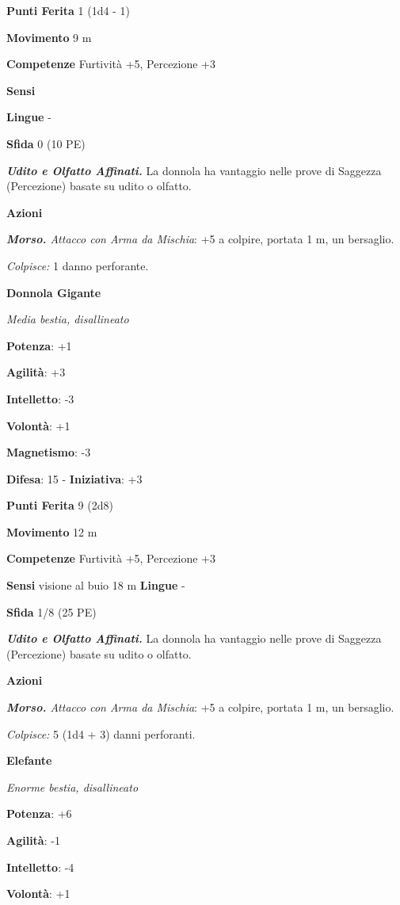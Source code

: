 \begin{multicols}{2}
\textbf{Punti Ferita} 1 (1d4 - 1)

\textbf{Movimento} 9 m

\textbf{Competenze} Furtività +5, Percezione +3

\textbf{Sensi} 

\textbf{Lingue} -

\textbf{Sfida} 0 (10 PE)\smallskip

\emph{\textbf{Udito e Olfatto Affinati.}} La donnola ha vantaggio nelle
prove di Saggezza (Percezione) basate su udito o olfatto.

\smallskip\textbf{Azioni}

\emph{\textbf{Morso.} Attacco con Arma da Mischia}: +5 a colpire,
portata 1 m, un bersaglio.

\emph{Colpisce:} 1 danno perforante.

\textbf{Donnola Gigante}

\emph{Media bestia, disallineato}

\textbf{Potenza}: +1

\textbf{Agilità}: +3

\textbf{Intelletto}: -3

\textbf{Volontà}: +1

\textbf{Magnetismo}: -3

\textbf{Difesa}: 15 - \textbf{Iniziativa}: +3

\textbf{Punti Ferita} 9 (2d8)

\textbf{Movimento} 12 m

\textbf{Competenze} Furtività +5, Percezione +3

\textbf{Sensi} visione al buio 18 m
\textbf{Lingue} -

\textbf{Sfida} 1/8 (25 PE)\smallskip

\emph{\textbf{Udito e Olfatto Affinati.}} La donnola ha vantaggio nelle
prove di Saggezza (Percezione) basate su udito o olfatto.

\smallskip\textbf{Azioni}

\emph{\textbf{Morso.} Attacco con Arma da Mischia}: +5 a colpire,
portata 1 m, un bersaglio.

\emph{Colpisce:} 5 (1d4 + 3) danni perforanti.

\textbf{Elefante}

\emph{Enorme bestia, disallineato}

\textbf{Potenza}: +6

\textbf{Agilità}: -1

\textbf{Intelletto}: -4

\textbf{Volontà}: +1


\end{multicols}
